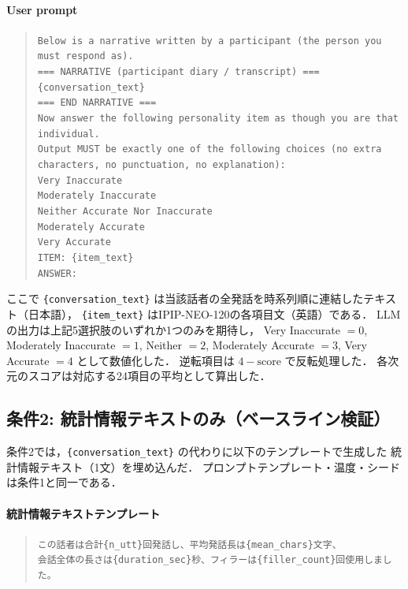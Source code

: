 \documentclass[dvipdfmx,11pt,a4paper]{bxjsarticle}
\begin{document}
\paragraph{User prompt}
\begin{quote}
\small
\texttt{Below is a narrative written by a participant (the person you must respond as).}\\[4pt]
\texttt{=== NARRATIVE (participant diary / transcript) ===}\\
\texttt{\{conversation\_text\}}\\
\texttt{=== END NARRATIVE ===}\\[4pt]
\texttt{Now answer the following personality item as though you are that individual.}\\
\texttt{Output MUST be exactly one of the following choices (no extra characters, no punctuation, no explanation):}\\
\texttt{Very Inaccurate}\\
\texttt{Moderately Inaccurate}\\
\texttt{Neither Accurate Nor Inaccurate}\\
\texttt{Moderately Accurate}\\
\texttt{Very Accurate}\\[4pt]
\texttt{ITEM: \{item\_text\}}\\
\texttt{ANSWER:}
\end{quote}

ここで \texttt{\{conversation\_text\}} は当該話者の全発話を時系列順に連結したテキスト（日本語），
\texttt{\{item\_text\}} はIPIP-NEO-120の各項目文（英語）である．
LLMの出力は上記5選択肢のいずれか1つのみを期待し，
Very Inaccurate $= 0$, Moderately Inaccurate $= 1$, Neither $= 2$,
Moderately Accurate $= 3$, Very Accurate $= 4$ として数値化した．
逆転項目は $4 - \text{score}$ で反転処理した．
各次元のスコアは対応する24項目の平均として算出した．

\subsection{条件2: 統計情報テキストのみ（ベースライン検証）}
\label{sec:appendix_prompt_cond2}

条件2では，\texttt{\{conversation\_text\}} の代わりに以下のテンプレートで生成した
統計情報テキスト（1文）を埋め込んだ．
プロンプトテンプレート・温度・シードは条件1と同一である．

\paragraph{統計情報テキストテンプレート}
\begin{quote}
\small
\texttt{この話者は合計\{n\_utt\}回発話し、平均発話長は\{mean\_chars\}文字、}\\
\texttt{会話全体の長さは\{duration\_sec\}秒、フィラーは\{filler\_count\}回使用しました。}
\end{quote}
\end{document}
